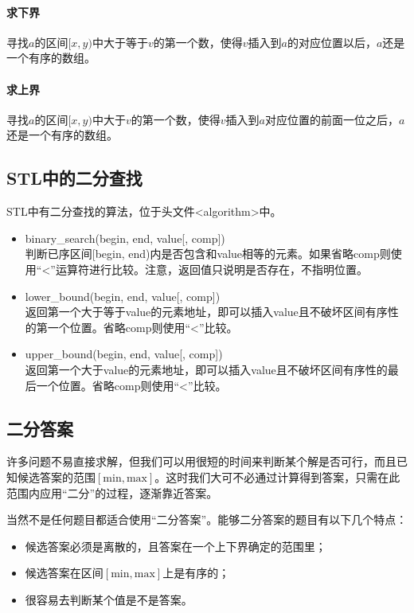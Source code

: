 \paragraph{求下界} 寻找$a$的区间$[x, y)$中大于等于$v$的第一个数，使得$v$插入到$a$的对应位置以后，$a$还是一个有序的数组。



\paragraph{求上界} 寻找$a$的区间$[x, y)$中大于$v$的第一个数，使得$v$插入到$a$对应位置的前面一位之后，$a$还是一个有序的数组。



\subsection{STL中的二分查找}

STL中有二分查找的算法，位于头文件<algorithm>中。

\begin{itemize}
  \item binary\_search(begin, end, value[, comp])\\判断已序区间[begin, end)内是否包含和value相等的元素。如果省略comp则使用“<”运算符进行比较。注意，返回值只说明是否存在，不指明位置。
  \item lower\_bound(begin, end, value[, comp])\\返回第一个大于等于value的元素地址，即可以插入value且不破坏区间有序性的第一个位置。省略comp则使用“<”比较。
  \item upper\_bound(begin, end, value[, comp])\\返回第一个大于value的元素地址，即可以插入value且不破坏区间有序性的最后一个位置。省略comp则使用“<”比较。
\end{itemize}

\subsection{二分答案}

许多问题不易直接求解，但我们可以用很短的时间来判断某个解是否可行，而且已知候选答案的范围$[\mathrm{min},\mathrm{max}]$。这时我们大可不必通过计算得到答案，只需在此范围内应用“二分”的过程，逐渐靠近答案。

当然不是任何题目都适合使用“二分答案”。能够二分答案的题目有以下几个特点：

\begin{itemize}
  \item 候选答案必须是离散的，且答案在一个上下界确定的范围里；
  \item 候选答案在区间$[\mathrm{min},\mathrm{max}]$上是有序的；
  \item 很容易去判断某个值是不是答案。
\end{itemize}

